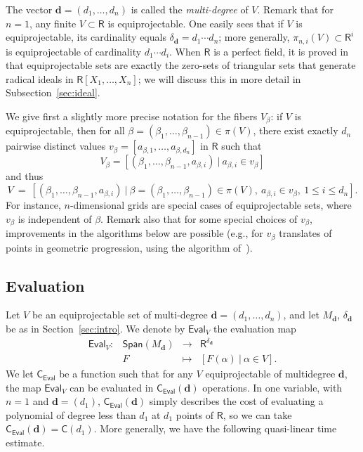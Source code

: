 \documentclass[amsthm]{elsart}
\def\d {\ensuremath{\mathbf{d}}}
\def\C {\ensuremath{\mathsf{C}}}
\def\rng {\ensuremath{\mathsf{R}}}
\def\Span {\ensuremath{\mathsf{Span}}}
\def\Eval {\ensuremath{\mathsf{Eval}}}
\theoremstyle{plain}
\begin{document}
\smallskip\noindent
The vector $\d=(d_1,\dots,d_n)$ is called the {\em multi-degree} of
$V$. Remark that for $n=1$, any finite $V \subset \rng$ is equiprojectable.
One easily sees that if $V$ is equiprojectable, its cardinality equals
$\delta_\d=d_1\cdots d_n$; more generally, $\pi_{n,i}(V) \subset \rng^i$ is
equiprojectable of cardinality $d_1 \cdots d_i$. When $\rng$ is a
perfect field, it is proved in~\cite{AuVa00} that equiprojectable sets
are exactly the zero-sets of triangular sets that generate radical
ideals in $\rng[X_1,\dots,X_n]$; we will discuss this in more detail
in Subsection~\ref{sec:ideal}.

We give first a slightly more precise notation for the fibers $V_\beta$:
if $V$ is equiprojectable, then for all
$\beta=(\beta_1,\dots,\beta_{n-1}) \in \pi(V)$,
there exist exactly $d_n$ pairwise distinct values
$v_{\beta}=[a_{\beta,1},\dots,a_{\beta,d_n}]$ in $\rng$ such that
$$V_\beta = [ (\beta_1,\dots,\beta_{n-1},a_{\beta,i}) \ | \ a_{\beta,i} \in v_\beta ]$$
and thus
$$V\ =\ 
[ (\beta_1,\dots,\beta_{n-1},a_{\beta,i}) \ | \
\beta=(\beta_1,\dots,\beta_{n-1}) \in \pi(V),\ a_{\beta,i} \in
v_\beta,\ 1 \le i \le d_n ].$$ For instance, $n$-dimensional grids are
special cases of equiprojectable sets, where $v_{\beta}$ is
independent of $\beta$. Remark also that for some special choices of
$v_\beta$, improvements in the algorithms below are possible (e.g.,
for $v_\beta$ translates of points in geometric progression, using the
algorithm of~\cite{AhStUl75}).



\subsection{Evaluation}

Let $V$ be an equiprojectable set of multi-degree $\d=(d_1,\dots,d_n)$,
and let $M_\d$, $\delta_\d$ be as in Section~\ref{sec:intro}. We
denote by $\Eval_V$ the evaluation map
$$\begin{array}{cccc}
\Eval_V:&\Span(M_\d) & \to & \rng^{\delta_\d} \\
& F & \mapsto &[F(\alpha) \ | \ \alpha \in V].
\end{array}$$
We let $\C_\Eval$ be a function such that for any $V$ equiprojectable
of multidegree $\d$, the map $\Eval_V$ can be evaluated in
$\C_\Eval(\d)$  operations. In one variable, with
$n=1$ and $\d=(d_1)$, $\C_\Eval(\d)$ simply describes the cost of evaluating a
polynomial of degree less than $d_1$ at $d_1$ points of $\rng$, so
we can take $\C_\Eval(\d) = \C(d_1)$. More generally, we have the following
quasi-linear time estimate.
\end{document}
